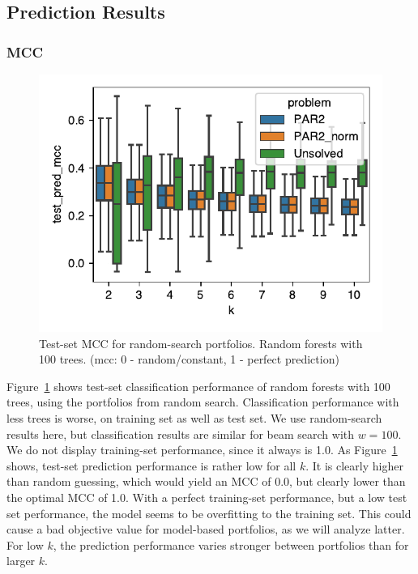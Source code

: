 \documentclass[conference]{IEEEtran}
\begin{document}
\subsection{Prediction Results}

\subsubsection{MCC}

\begin{figure}[t]
	\centering
	\includegraphics[width=\columnwidth]{plots/prediction-test-mcc.pdf}
	\caption{Test-set MCC for random-search portfolios. Random forests with 100 trees. (mcc: 0 - random/constant, 1 - perfect prediction)}
	\label{fig:prediction-test-mcc}
\end{figure}

Figure~\ref{fig:prediction-test-mcc} shows test-set classification performance of random forests with 100 trees, using the portfolios from random search.
Classification performance with less trees is worse, on training set as well as test set.
We use random-search results here, but classification results are similar for beam search with $w=100$.
We do not display training-set performance, since it always is 1.0.
As Figure~\ref{fig:prediction-test-mcc} shows, test-set prediction performance is rather low for all $k$.
It is clearly higher than random guessing, which would yield an MCC of 0.0, but clearly lower than the optimal MCC of 1.0.
With a perfect training-set performance, but a low test set performance, the model seems to be overfitting to the training set.
This could cause a bad objective value for model-based portfolios, as we will analyze latter.
For low $k$, the prediction performance varies stronger between portfolios than for larger $k$.
\end{document}
